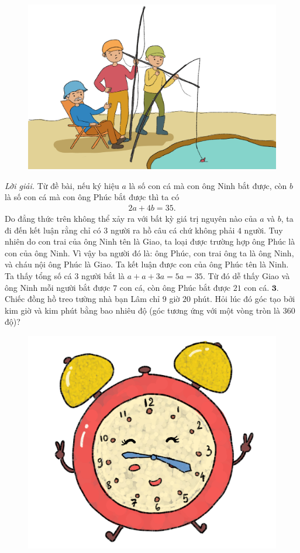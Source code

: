 \begin{multicols}{2}
	\begin{figure}[H]
		\centering
		\vspace*{-10pt}
		\captionsetup{labelformat= empty, justification=centering}
		\includegraphics[width=1\linewidth]{bai2}
		\vspace*{-15pt}
		\end{figure}
	\textit{Lời giải.} 	Từ đề bài, nếu ký hiệu $a$ là số con cá mà con ông Ninh bắt được, còn $b$ là số con cá mà con ông Phúc bắt được thì ta có 
	\begin{align*}
			2a+4b = 35.
		\end{align*}
	Do đẳng thức trên không thể xảy ra với bất kỳ giá trị nguyên nào của $a$ và $b$, ta đi đến kết luận rằng chỉ có $3$ người ra hồ câu cá chứ không phải $4$ người. Tuy nhiên do con trai của ông Ninh tên là Giao, ta loại được trường hợp ông Phúc là con của ông Ninh. Vì vậy ba người đó là: ông Phúc, con trai ông ta là ông Ninh,  và cháu nội ông Phúc là Giao. Ta kết luận được con của ông Phúc tên là Ninh.
	\vskip 0.1cm
	Ta thấy tổng số cá $3$ người bắt là $a+a+3a=5a = 35$. Từ đó dễ thấy Giao và ông Ninh mỗi người bắt được $7$ con cá, còn ông Phúc bắt được $21$ con cá.
	\vskip 0.1cm
	$\pmb{3.}$ Chiếc đồng hồ treo tường nhà bạn Lâm chỉ  $9$ giờ $20$ phút. Hỏi lúc đó góc tạo bởi kim giờ và kim phút bằng bao nhiêu độ (góc tương ứng với một vòng tròn là $360$ độ)?
	\begin{figure}[H]
			\centering
			\vspace*{-10pt}
			\captionsetup{labelformat= empty, justification=centering}
			\includegraphics[width=0.8\linewidth]{bai3}

\end{figure}
\end{multicols}

